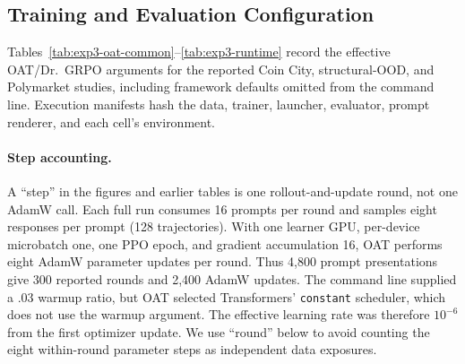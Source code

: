 \subsection{Training and Evaluation Configuration}
\label{app:exp3-complete-training-setup}

Tables~\ref{tab:exp3-oat-common}--\ref{tab:exp3-runtime} record the effective
OAT/Dr.~GRPO arguments for the reported Coin City, structural-OOD, and
Polymarket studies, including framework defaults omitted from the command line.
Execution manifests hash the data, trainer, launcher, evaluator, prompt
renderer, and each cell's environment.

\paragraph{Step accounting.}
A ``step'' in the figures and earlier tables is one rollout-and-update round, not one
AdamW call.  Each full run consumes 16 prompts per round and samples eight responses
per prompt (128 trajectories).  With one learner GPU, per-device microbatch one, one
PPO epoch, and gradient accumulation 16, OAT performs eight AdamW parameter updates per
round. Thus 4,800 prompt presentations give 300 reported rounds and 2,400 AdamW
updates. The command line supplied a .03 warmup ratio, but OAT selected
Transformers' \texttt{constant} scheduler, which does not use the warmup argument.
The effective learning rate was therefore $10^{-6}$ from the first optimizer
update. We use ``round'' below to avoid counting the eight within-round parameter
steps as independent data exposures.

